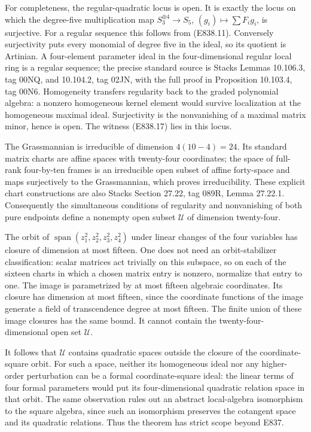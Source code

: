 For completeness, the regular-quadratic locus is open. It is exactly the
locus on which the degree-five multiplication map
\(S_3^{\oplus4}\to S_5\), \((g_i)\mapsto\sum F_i g_i\), is surjective.
For a regular sequence this follows from (E838.11). Conversely
surjectivity puts every monomial of degree five in the ideal, so its
quotient is Artinian. A four-element parameter ideal in the
four-dimensional regular local ring is a regular sequence; the precise
standard source is Stacks Lemmas 10.106.3, tag 00NQ, and 10.104.2, tag
02JN, with the full proof in Proposition 10.103.4, tag 00N6\cite{SFStacksQuadraticJets}. Homogeneity
transfers regularity back to the graded polynomial algebra: a nonzero
homogeneous kernel element would survive localization at the homogeneous
maximal ideal. Surjectivity is the nonvanishing of a maximal matrix
minor, hence is open. The witness (E838.17) lies in this locus.

The Grassmannian is irreducible of dimension \(4(10-4)=24\). Its
standard matrix charts are affine spaces with twenty-four coordinates;
the space of full-rank four-by-ten frames is an irreducible open subset
of affine forty-space and maps surjectively to the Grassmannian, which
proves irreducibility. These explicit chart constructions are also
Stacks Section 27.22, tag 089R, Lemma 27.22.1\cite{SFStacksQuadraticJets}. Consequently the simultaneous conditions
of regularity and nonvanishing of both pure endpoints define a nonempty
open subset \(\mathcal U\) of dimension twenty-four.

The orbit of \(\operatorname{span}(z_1^2,z_2^2,z_3^2,z_4^2)\) under
linear changes of the four variables has closure of dimension at most
fifteen. One does not need an orbit-stabilizer classification: scalar
matrices act trivially on this subspace, so on each of the sixteen
charts in which a chosen matrix entry is nonzero, normalize that entry
to one. The image is parametrized by at most fifteen algebraic
coordinates. Its closure has dimension at most fifteen, since the
coordinate functions of the image generate a field of transcendence
degree at most fifteen. The finite union of these image closures has the
same bound. It cannot contain the twenty-four-dimensional open set
\(\mathcal U\).

It follows that \(\mathcal U\) contains quadratic spaces outside the
closure of the coordinate-square orbit. For such a space, neither its
homogeneous ideal nor any higher-order perturbation can be a formal
coordinate-square ideal: the linear terms of four formal parameters
would put its four-dimensional quadratic relation space in that orbit.
The same observation rules out an abstract local-algebra isomorphism to
the square algebra, since such an isomorphism preserves the cotangent
space and its quadratic relations. Thus the theorem has strict scope
beyond E837.

